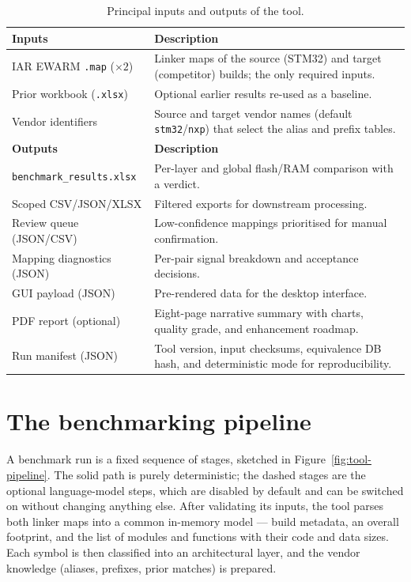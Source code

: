 \begin{table}[H]
\centering
\caption{Principal inputs and outputs of the tool.}
\label{tab:tool-io}
\begin{tabularx}{\textwidth}{l X}
\toprule
\textbf{Inputs} & \textbf{Description} \\
\midrule
IAR EWARM \texttt{.map} ($\times 2$) & Linker maps of the source (STM32) and target (competitor) builds; the only required inputs. \\
Prior workbook (\texttt{.xlsx}) & Optional earlier results re-used as a baseline. \\
Vendor identifiers & Source and target vendor names (default \texttt{stm32}/\texttt{nxp}) that select the alias and prefix tables. \\
\midrule
\textbf{Outputs} & \textbf{Description} \\
\midrule
\texttt{benchmark\_results.xlsx} & Per-layer and global flash/RAM comparison with a verdict. \\
Scoped CSV/JSON/XLSX & Filtered exports for downstream processing. \\
Review queue (JSON/CSV) & Low-confidence mappings prioritised for manual confirmation. \\
Mapping diagnostics (JSON) & Per-pair signal breakdown and acceptance decisions. \\
GUI payload (JSON) & Pre-rendered data for the desktop interface. \\
PDF report (optional) & Eight-page narrative summary with charts, quality grade, and enhancement roadmap. \\
Run manifest (JSON) & Tool version, input checksums, equivalence DB hash, and deterministic mode for reproducibility. \\
\bottomrule
\end{tabularx}
\end{table}

\section{The benchmarking pipeline}
\label{sec:tool-pipeline}

A benchmark run is a fixed sequence of stages, sketched in
Figure~\ref{fig:tool-pipeline}. The solid path is purely deterministic; the dashed stages
are the optional language-model steps, which are disabled by default and can be switched on
without changing anything else. After validating its inputs, the tool parses both linker
maps into a common in-memory model --- build metadata, an overall footprint, and the list
of modules and functions with their code and data sizes. Each symbol is then classified
into an architectural layer, and the vendor knowledge (aliases, prefixes, prior matches) is
prepared.

